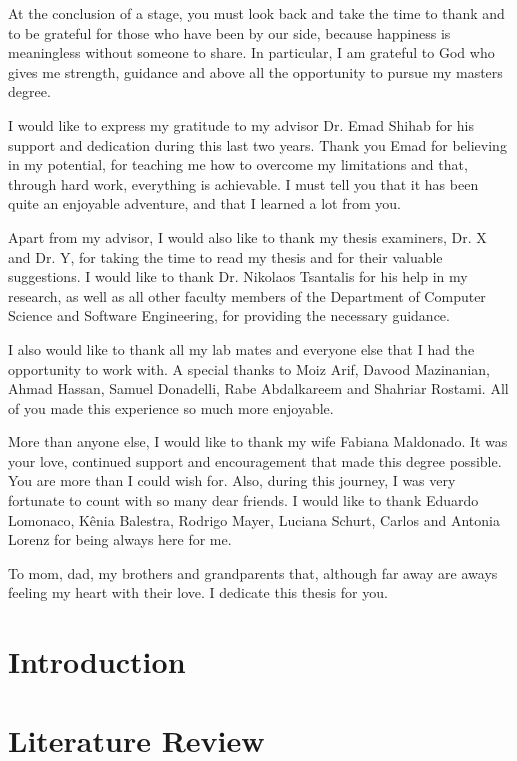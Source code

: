 \documentclass{report}
\begin{document}
\begin{acknowledgments}
At the conclusion of a stage, you must look back and take the time to thank and to be grateful for those who have been by our side, because happiness is meaningless without someone to share. In particular, I am grateful to God who gives me strength, guidance and above all the opportunity to pursue my masters degree. 

I would like to express my gratitude to my advisor Dr. Emad Shihab for his support and dedication during this last two years. Thank you Emad for believing in my potential, for teaching me how to overcome my limitations and that, through hard work, everything is achievable. I must tell you that it has been quite an enjoyable adventure, and that I learned a lot from you. 

Apart from my advisor, I would also like to thank my thesis examiners, Dr. X and Dr. Y, for taking the time to read my thesis and for their valuable suggestions. I would like to thank Dr. Nikolaos Tsantalis for his help in my research, as well as all other faculty members of the Department of Computer Science and Software Engineering, for providing the necessary guidance.

I also would like to thank all my lab mates and everyone else that I had the opportunity to work with. A special thanks to Moiz Arif, Davood Mazinanian, Ahmad Hassan, Samuel Donadelli, Rabe Abdalkareem and Shahriar Rostami. All of you made this experience so much more enjoyable. 

More than anyone else, I would like to thank my wife Fabiana Maldonado. It was your love, continued support and encouragement that made this degree possible. You are more than I could wish for. Also, during this journey, I was very fortunate to count with so many dear friends. I would like to thank Eduardo Lomonaco, K\^{e}nia Balestra, Rodrigo Mayer, Luciana Schurt, Carlos and Antonia Lorenz for being always here for me. 

To mom, dad, my brothers and grandparents that, although far away are aways feeling my heart with their love. I dedicate this thesis for you.
\end{acknowledgments}

\chapter{Introduction}
\label{introduction}


\chapter{Literature Review}
\label{literature_review}

\end{document}
